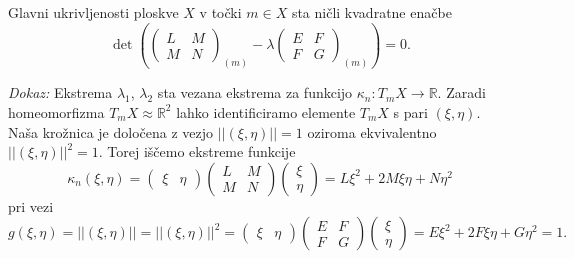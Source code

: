 \begin{izrek}
\label{izr_glavni_ukrivljenosti_sta_nicli_kvadratne_emacbe}
  Glavni ukrivljenosti ploskve $X$ v točki $m \in X$ sta ničli kvadratne enačbe 
  \begin{equation*} \det \left( \begin{pmatrix}
  L & M \\
  M & N
  \end{pmatrix}_{(m)} - \lambda \begin{pmatrix}
  E & F \\
  F & G
  \end{pmatrix}_{(m)}  \right) = 0. \end{equation*}
\end{izrek}
\noindent
{\em Dokaz:\/}
 Ekstrema $\lambda_1$, $\lambda_2$ sta vezana ekstrema za funkcijo $\kappa_n: T_mX \to \mathbb{R}$.
 Zaradi homeomorfizma $T_mX \approx \mathbb{R}^2$ lahko identificiramo elemente $T_mX$ s pari $(\xi, \eta)$. Naša krožnica je
 določena z vezjo $\lvert\lvert (\xi, \eta) \rvert\rvert = 1$ oziroma ekvivalentno $\lvert\lvert (\xi, \eta) \rvert\rvert^2 = 1$. Torej iščemo ekstreme funkcije \begin{equation*}
   \kappa_n(\xi, \eta) = \begin{pmatrix}
     \xi & \eta 
   \end{pmatrix}
   \begin{pmatrix}
     L & M \\
     M & N
   \end{pmatrix}  
   \begin{pmatrix}
     \xi \\
     \eta 
   \end{pmatrix} = L \xi^2 + 2M \xi \eta + N \eta^2
 \end{equation*}  
   pri vezi \begin{equation*}
     g(\xi, \eta)  = \lvert\lvert (\xi, \eta) \rvert\rvert =  \lvert\lvert (\xi, \eta) \rvert\rvert^2 = \begin{pmatrix}
       \xi & \eta 
     \end{pmatrix}
     \begin{pmatrix}
       E & F \\
       F & G
     \end{pmatrix}  
     \begin{pmatrix}
       \xi \\
       \eta 
     \end{pmatrix} = E \xi^2 + 2F \xi \eta + G \eta^2 = 1.
   \end{equation*}  
